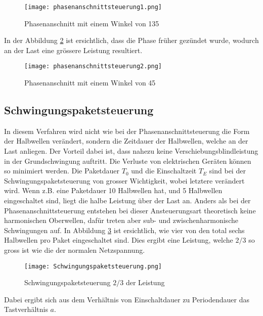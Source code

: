 \begin{figure}[ht!]
	\centering
	\texttt{[image: phasenanschnittsteuerung1.png]}	
	\caption{Phasenanschnitt mit einem Winkel von 135\textdegree \cite{Phasenanschnittsteuerung}}\label{fig:Phasenanschnitt1}
\end{figure}
\newpage
In der Abbildung \ref{fig:Phasenanschnitt2} ist ersichtlich, dass die Phase früher gezündet wurde, wodurch an der Last eine grössere Leistung resultiert.

\begin{figure}[ht!]
	\centering
	\texttt{[image: phasenanschnittsteuerung2.png]}	
	\caption{Phasenanschnitt mit einem Winkel von 45\textdegree \cite{Phasenanschnittsteuerung}}\label{fig:Phasenanschnitt2}
\end{figure}



\subsection{Schwingungspaketsteuerung}\label{sec:Schwingungspaketsteuerung}
In diesem Verfahren wird nicht wie bei der Phasenanschnittsteuerung die Form der Halbwellen verändert, sondern die Zeitdauer der Halbwellen, welche an der Last anliegen. Der Vorteil dabei ist, dass nahezu keine Verschiebungsblindleistung in der Grundschwingung auftritt. Die Verluste von elektrischen Geräten können so minimiert werden. Die Paketdauer $T_0$ und die Einschaltzeit $T_E$ sind bei der Schwingungspaketsteuerung von grosser Wichtigkeit, wobei letztere verändert wird. Wenn z.B. eine Paketdauer 10 Halbwellen hat, und 5 Halbwellen eingeschaltet sind, liegt die halbe Leistung über der Last an. Anders als bei der Phasenanschnittsteuerung entstehen bei dieser Ansteuerungsart theoretisch keine harmonischen Oberwellen, dafür treten aber sub- und zwischenharmonische Schwingungen auf. In Abbildung \ref{fig:Schwingungspaketsteuerung} ist ersichtlich, wie vier von den total sechs Halbwellen pro Paket eingeschaltet sind. Dies ergibt eine Leistung, welche ${2}/{3}$ so gross ist wie die der normalen Netzspannung.

\begin{figure}[ht!]
	\centering
	\texttt{[image: Schwingungspaketsteuerung.png]}	
	\caption{Schwingungspaketsteuerung ${2}/{3}$ der Leistung \cite{Schwingungspaketsteuerung}}\label{fig:Schwingungspaketsteuerung}
\end{figure}

Dabei ergibt sich aus dem Verhältnis von Einschaltdauer zu Periodendauer das Tastverhältnis $a$.

